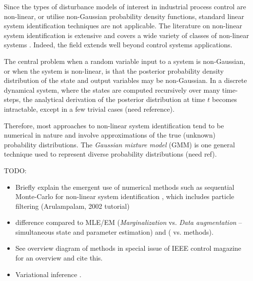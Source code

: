Since the types of disturbance models of interest in industrial process control are non-linear, or utilise non-Gaussian probability density functions, standard linear system identification techniques are not applicable. The literature on non-linear system identification is extensive and covers a wide variety of classes of non-linear systems \citep{schoukens_nonlinear_2019}. Indeed, the field extends well beyond control systems applications.


The central problem when a random variable input to a system is non-Gaussian, or when the system is non-linear, is that the posterior probability density distribution of the state and output variables may be non-Gaussian. In a discrete dynamical system, where the states are computed recursively over many time-steps, the analytical derivation of the posterior distribution at time $t$ becomes intractable, except in a few trivial cases (need reference).

Therefore, most approaches to non-linear system identification tend to be numerical in nature and involve approximations of the true (unknown) probability distributions. The \textit{Gaussian mixture model} (GMM) is one general technique used to represent diverse probability distributions (need ref).




TODO:
\begin{itemize}
	\item Briefly explain the emergent use of numerical methods such as sequential Monte-Carlo for non-linear system identification \citep{schon_sequential_2015}, which includes particle filtering (Arulampalam, 2002 tutorial)
	\item difference compared to MLE/EM (\textit{Marginalization} vs. \textit{Data augmentation} – simultaneous state and parameter estimation) and ( vs.  methods).
	\item See overview diagram of methods in special issue of IEEE control magazine for an overview and cite this. \citep{wigren_nonlinear_2022}
	\item Variational inference \citep{ma_multiple-model_2019}.
\end{itemize}


